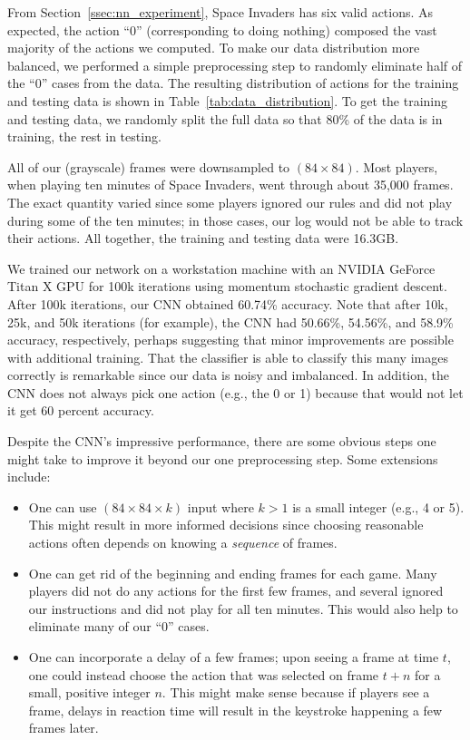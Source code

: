 \documentclass[letterpaper, 10 pt, conference]{ieeeconf}  %
\begin{document}
From Section~\ref{ssec:nn_experiment}, Space Invaders has six valid actions.  As expected, the
action ``0'' (corresponding to doing nothing) composed the vast majority of the actions we computed.
To make our data distribution more balanced, we performed a simple preprocessing step to randomly
eliminate half of the ``0'' cases from the data. The resulting distribution of actions for the
training and testing data is shown in Table~\ref{tab:data_distribution}.  To get the training and
testing data, we randomly split the full data so that 80\% of the data is in training, the rest in
testing.

All of our (grayscale) frames were downsampled to $(84\times 84)$. Most players, when playing ten
minutes of Space Invaders, went through about 35,000 frames. The exact quantity varied since some
players ignored our rules and did not play during some of the ten minutes; in those cases, our log
would not be able to track their actions. All together, the training and testing data were 16.3GB.

We trained our network on a workstation machine with an NVIDIA GeForce Titan X GPU for 100k
iterations using momentum stochastic gradient descent. After 100k iterations, our CNN obtained
60.74\% accuracy. Note that after 10k, 25k, and 50k iterations (for example), the CNN had 50.66\%,
54.56\%, and 58.9\% accuracy, respectively, perhaps suggesting that minor improvements are possible
with additional training. That the classifier is able to classify this many images correctly is
remarkable since our data is noisy and imbalanced. In addition, the CNN does not always pick one
action (e.g., the 0 or 1) because that would not let it get 60 percent accuracy.

Despite the CNN's impressive performance, there are some obvious steps one might take to improve it
beyond our one preprocessing step. Some extensions include:

\begin{itemize}
    \item One can use $(84\times 84\times k)$ input where $k > 1$ is a small integer (e.g., 4 or 5).
    This might result in more informed decisions since choosing reasonable actions often depends on
    knowing a \emph{sequence} of frames.
    \item One can get rid of the beginning and ending frames for each game. Many players did not do
    any actions for the first few frames, and several ignored our instructions and did not play for
    all ten minutes. This would also help to eliminate many of our ``0'' cases.
    \item One can incorporate a delay of a few frames; upon seeing a frame at time $t$, one could
    instead choose the action that was selected on frame $t+n$ for a small, positive integer $n$.
    This might make sense because if players see a frame, delays in reaction time will result in the
    keystroke happening a few frames later.
\end{itemize}
\end{document}
